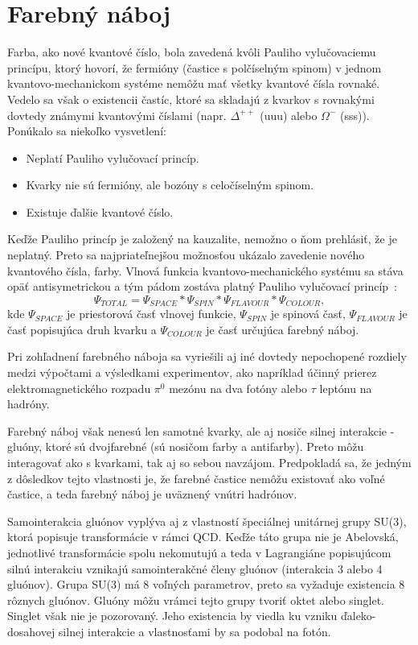 \documentclass[thesismargins, thesislinespacing]{rnthesis}
\begin{document}
\section{Farebný náboj}
Farba, ako nové kvantové číslo, bola zavedená kvôli Pauliho vylučovaciemu princípu, ktorý hovorí, že fermióny (častice s polčíselným spinom) v jednom kvantovo-me\-cha\-nic\-kom systéme nemôžu mať všetky kvantové čísla rovnaké. Vedelo sa však o existencii častíc, ktoré sa skladajú z kvarkov s rovnakými dovtedy známymi kvantovými číslami (napr. $\Delta^{++}$ (uuu) alebo $\Omega^{-}$ (sss)). Ponúkalo sa niekoľko vysvetlení:
\begin{itemize}
	\item Neplatí Pauliho vylučovací princíp.
	\item Kvarky nie sú fermióny, ale bozóny s celočíselným spinom.
	\item Existuje ďalšie kvantové číslo.
\end{itemize}
Keďže Pauliho princíp je založený na kauzalite, nemožno o ňom prehlásiť, že je neplatný. Preto sa najpriateľnejšou možnosťou ukázalo zavedenie nového kvantového čísla, farby. Vlnová funkcia kvantovo-mechanického systému sa stáva opäť antisymetrickou a tým pádom zostáva platný Pauliho vylučovací princíp~\cite{1}:
\begin{equation}
	\Psi_{TOTAL}=\Psi_{SPACE}*\Psi_{SPIN}*\Psi_{FLAVOUR}*\Psi_{COLOUR}, 
\end{equation}   
kde $\Psi_{SPACE}$ je priestorová časť vlnovej funkcie, $\Psi_{SPIN}$ je spinová časť, $\Psi_{FLAVOUR}$ je časť popisujúca druh kvarku a $\Psi_{COLOUR}$ je časť určujúca farebný náboj.

Pri zohľadnení farebného náboja sa vyriešili aj iné dovtedy nepochopené rozdiely medzi výpočtami a výsledkami experimentov, ako napríklad účinný prierez elektromagnetického rozpadu $\pi^0$ mezónu na dva fotóny alebo $\tau$ leptónu na hadróny. 

Farebný náboj však nenesú len samotné kvarky, ale aj nosiče silnej interakcie - gluóny, ktoré sú dvojfarebné (sú nosičom farby a antifarby). Preto môžu interagovať ako s kvarkami, tak aj so sebou navzájom. Predpokladá sa, že jedným z dôsledkov tejto vlastnosti je, že farebné častice nemôžu existovať ako voľné častice, a teda farebný náboj je uväznený vnútri hadrónov.

Samointerakcia gluónov vyplýva aj z vlastností špeciálnej unitárnej grupy SU(3), ktorá popisuje transformácie v rámci QCD. Keďže táto grupa nie je Abelovská, jednotlivé transformácie spolu nekomutujú a teda v Lagrangiáne popisujúcom silnú interakciu vznikajú samointerakčné členy gluónov (interakcia 3 alebo 4 gluónov). Grupa SU(3) má 8 voľných parametrov, preto sa vyžaduje existencia 8 rôznych gluónov. Gluóny môžu vrámci tejto grupy tvoriť oktet alebo singlet. Singlet však nie je pozorovaný. Jeho existencia by viedla ku vzniku ďaleko-dosahovej silnej interakcie a vlastnosťami by sa podobal na fotón. 
\end{document}
